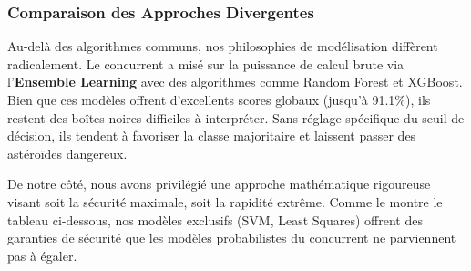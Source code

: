 \documentclass[11pt]{article}
\begin{document}
\subsubsection{Comparaison des Approches
  Divergentes}\label{comparaison-des-approches-divergentes}

Au-delà des algorithmes communs, nos philosophies de modélisation
diffèrent radicalement. Le concurrent a misé sur la puissance de calcul
brute via l'\textbf{Ensemble Learning} avec des algorithmes comme Random
Forest et XGBoost. Bien que ces modèles offrent d'excellents scores
globaux (jusqu'à 91.1\%), ils restent des boîtes noires difficiles à
interpréter. Sans réglage spécifique du seuil de décision, ils tendent à
favoriser la classe majoritaire et laissent passer des astéroïdes
dangereux.

De notre côté, nous avons privilégié une approche mathématique
rigoureuse visant soit la sécurité maximale, soit la rapidité extrême.
Comme le montre le tableau ci-dessous, nos modèles exclusifs (SVM, Least
Squares) offrent des garanties de sécurité que les modèles probabilistes
du concurrent ne parviennent pas à égaler.
\end{document}
